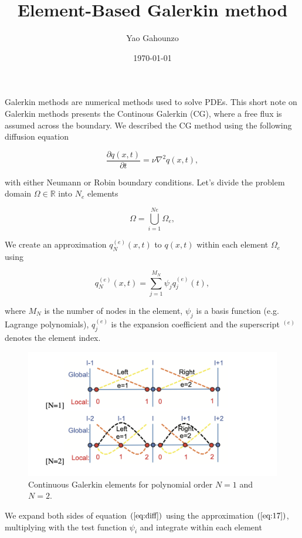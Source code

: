 \documentclass[11pt,a4paper]{article}
\title{Element-Based Galerkin method}
\author{Yao Gahounzo}
\date{\today}
\begin{document}
    \maketitle
    
    Galerkin methods are numerical methods used to solve PDEs. This short note on Galerkin methods presents the Continous Galerkin (CG), where a free flux is assumed across the boundary. We described the CG method using the following diffusion equation
	
	\begin{equation}
	\label{eq:diff}
	    \dfrac{\partial q(x,t)}{\partial t} = \nu\nabla^2 q(x,t),
	\end{equation}
	
	\noindent with either Neumann or Robin boundary conditions. Let's divide the problem domain $\Omega\in\mathbb{R}$ into $N_e$ elements
	
	$$\Omega = \bigcup_{i=1}^{Ne}\Omega_e,$$
	
	We create an approximation $q_N^{(e)}(x,t)$ to $q(x,t)$ within each element $\Omega_e$ using 
	
	\begin{equation}
	\label{eq:17}
	    q_N^{(e)}(x,t) = \sum_{j=1}^{M_N} \psi_jq_j^{(e)}(t),
	\end{equation}
	
	where $M_N$ is the number of nodes in the element, $\psi_j$ is a basis function (e.g. Lagrange polynomials), $q_j^{(e)}$ is the expansion coefficient and the superscript $^{(e)}$ denotes the element index.
	
	\begin{figure}[H]
	    \centering 
	    \includegraphics[width=12cm]{CGpoly}
	    \caption*{Continuous Galerkin elements for polynomial order $N = 1$ and $N = 2$.}
    \end{figure} 
	
	We expand both sides of equation $(\ref{eq:diff})$ using the approximation $(\ref{eq:17})$, multiplying with the test function $\psi_i$ and integrate within each element 
	
\end{document}
